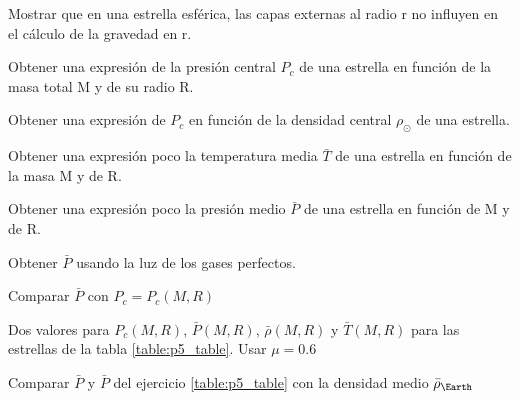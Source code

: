 \documentclass[12pt,a4paper]{practice}
\begin{document}
    \begin{problem}\label{prob:3}
    Mostrar que en una estrella esférica, las capas externas al radio r no influyen en el cálculo de la gravedad en r.
    \end{problem}

    \begin{problem}\label{prob:4}
        \begin{ppart}\label{prob:4:a}
        Obtener una expresión de la presión central $P_{c}$ de una estrella en función de la masa total M y de su radio R.
        \end{ppart}

        \begin{ppart}\label{prob:4:b}
        Obtener una expresión de $P_{c}$ en función de la densidad central $\rho_{\odot}$ de una estrella.
        \end{ppart}

        \begin{ppart}\label{prob:4:c}
        Obtener una expresión poco la temperatura media $\bar{T}$ de una estrella en función de la masa M y de R.
        \end{ppart}

        \begin{ppart}\label{prob:4:d}
        Obtener  una expresión poco la presión medio $\bar{P}$ de una estrella en función de M y de R.
        \end{ppart}

        \begin{ppart}\label{prob:4:e}
        Obtener $\bar{P}$  usando la luz de los gases perfectos.
        \end{ppart}

        \begin{ppart}\label{prob:4:f}
        Comparar $\bar{P}$ con $P_{c} = P_{c} (M,R)$
        \end{ppart}
    \end{problem}

    \begin{problem}\label{prob:5}
    Dos valores para $P_{c}(M,R)$, $\bar{P}(M,R)$, $\bar{\rho}(M,R)$ y $\bar{T}(M,R)$ para las estrellas de la tabla \ref{table:p5_table}. Usar $\mu = 0.6$
    \end{problem}

    \begin{problem}\label{prob:6}
    Comparar $\bar{P}$ y $\bar{P}$ del ejercicio \ref{table:p5_table} con la densidad medio $\bar{\rho}_{\Earth}$
    \end{problem}
\end{document}
